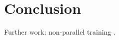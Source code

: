 \chapter{Conclusion} %
\label{cha:conclusion}
Further work: non-parallel training \cite{mouchtaris06}.
